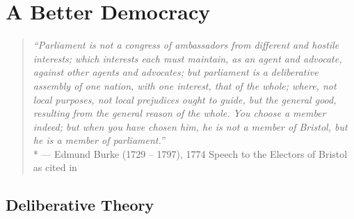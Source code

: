 
\chapter[Better Democracy]{A Better Democracy} \label{chap:better-democracy}

\begin{quote}
	\emph{``Parliament is not a congress of ambassadors from different and hostile interests; which interests each must maintain, as an agent and advocate, against other agents and advocates; but parliament is a deliberative assembly of one nation, with one interest, that of the whole; where, not local purposes, not local prejudices ought to guide, but the general good, resulting from the general reason of the whole. You choose a member indeed; but when you have chosen him, he is not a member of Bristol, but he is a member of parliament.''}\\*
	--- Edmund Burke (1729 -- 1797), 1774 Speech to the Electors of Bristol as cited in \citep{Burke1886}
\end{quote}





\section{Deliberative Theory}



